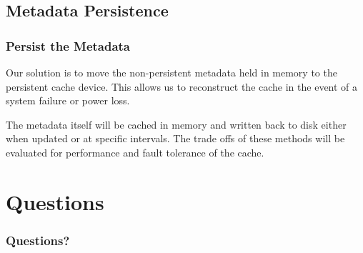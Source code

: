 \documentclass{beamer}
\begin{document}
\subsection{Metadata Persistence}

\begin{frame}
  \frametitle{Persist the Metadata}

  Our solution is to move the non-persistent metadata held in memory
  to the persistent cache device. This allows us to reconstruct the
  cache in the event of a system failure or power loss.

  The metadata itself will be cached in memory and written back to
  disk either when updated or at specific intervals. The trade offs of
  these methods will be evaluated for performance and fault tolerance
  of the cache.

\end{frame}



\section{Questions}

\begin{frame}
  \frametitle{Questions?}
\end{frame}

\end{document}
